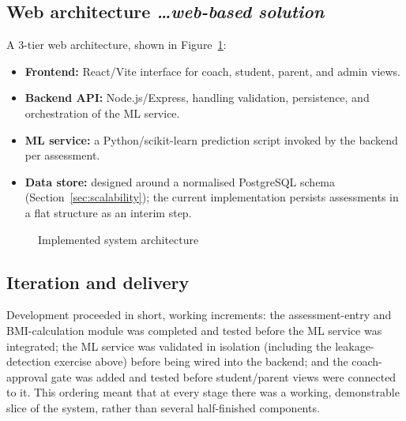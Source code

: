\documentclass[11pt,a4paper]{article}
\newcommand{\BvrHint}[1]{%
  {\normalfont\normalsize\itshape\hfill #1}}
\begin{document}
\subsection{Web architecture %
\BvrHint{\ldots web-based solution}}
A 3-tier web architecture, shown in Figure~\ref{fig:architecture}:
\begin{itemize}[leftmargin=0.7cm]
    \item \textbf{Frontend:} React/Vite interface for coach, student, parent, and admin views.
    \item \textbf{Backend API:} Node.js/Express, handling validation, persistence, and orchestration of the ML service.
    \item \textbf{ML service:} a Python/scikit-learn prediction script invoked by the backend per assessment.
    \item \textbf{Data store:} designed around a normalised PostgreSQL schema (Section~\ref{sec:scalability}); the current implementation persists assessments in a flat structure as an interim step.
\end{itemize}

\begin{figure}[h]
\centering
{}
\caption{Implemented system architecture}
\label{fig:architecture}
\end{figure}

\subsection{Iteration and delivery}
Development proceeded in short, working increments: the
assessment-entry and BMI-calculation module was completed
and tested before the ML service was integrated; the ML
service was validated in isolation (including the
leakage-detection exercise above) before being wired into
the backend; and the coach-approval gate was added and
tested before student/parent views were connected to it.
This ordering meant that at every stage there was a
working, demonstrable slice of the system, rather than
several half-finished components.
\end{document}
